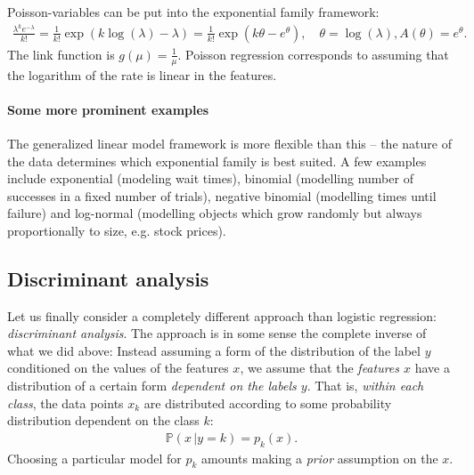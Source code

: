 \documentclass{article}
\begin{document}
Poisson-variables can be put into the exponential family framework:
\begin{align*}
   \frac{\lambda^ke^{-\lambda}}{k!} =  \frac{1}{k!}\exp(k\log(\lambda)-\lambda) = \frac{1}{k!}\exp(k\theta - e^\theta), \quad  \theta = \log(\lambda), A(\theta) = e^\theta. 
\end{align*}
The link function is $g(\mu)=\frac{1}{\mu}$. Poisson regression corresponds to assuming that the logarithm of the rate is linear in the features.

\paragraph{Some more prominent examples} The generalized linear model framework is more flexible than this -- the nature of the data determines which exponential family is best suited. A few examples include exponential (modeling wait times), binomial (modelling number of successes in a fixed number of trials), negative binomial (modelling times until failure) and log-normal (modelling objects which grow randomly but always proportionally to size, e.g. stock prices).


\subsection{Discriminant analysis} 
Let us finally consider a completely different approach than logistic regression: \emph{discriminant analysis}. The approach is in some sense the complete inverse of what we did above: Instead assuming a form of the distribution of the label $y$ conditioned on the values of the features $x$, we assume that the \emph{features $x$} have a distribution of a certain form \emph{dependent on the labels $y$}. That is, \emph{within each class},
the data points $x_k$ are distributed according to some probability distribution dependent on the class $k$:
\begin{align*}
    \mathbb{P}(x \, \vert y=k)= p_k(x). 
\end{align*}
Choosing a particular model for $p_k$ amounts making a \emph{prior} assumption on the $x$.
\end{document}
